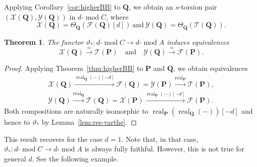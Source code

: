 \documentclass[11pt,a4paper,reqno]{amsart}
\theoremstyle{plain}
\newtheorem{theorem}{Theorem}[section]
\numberwithin{equation}{section}
\theoremstyle{definition}
\renewcommand{\mod}{\operatorname{mod}}
\newcommand{\real}{\operatorname{real}}
\newcommand{\emod}[2]{#1\text{-}\!\mod #2}
\newcommand{\PP}{\mathbf{P}}
\newcommand{\QQ}{\mathbf{Q}}
\newcommand{\T}{\mathcal{T}}
\newcommand{\F}{\mathcal{F}}
\newcommand{\X}{\mathcal{X}}
\newcommand{\Y}{\mathcal{Y}}
\begin{document}
Applying Corollary~\ref{cor:higherBB} to $\QQ$, we obtain an $s$-torsion pair $(\X(\QQ),\Y(\QQ))$ in $\emod{d}{C}$, where
\[\X(\QQ)=\Theta_{\QQ}(\F(\QQ)[d])\ \text{and}\ \Y(\QQ)=\Theta_{\QQ}(\T(\QQ)).\]

\begin{theorem}\label{thm:torsion-res}
The functor $\vartheta_*\colon\emod{d}{C}\to\emod{d}{A}$ induces equivalences
\[
 \X(\QQ)
 \xrightarrow{\simeq}
 \T(\PP)
 \quad\text{and}\quad
 \Y(\QQ)
 \xrightarrow{\simeq}
 \F(\PP).
\]
\end{theorem}

\begin{proof}
Applying Theorem~\ref{thm:higherBB} to $\PP$ and $\QQ$, we obtain equivalences
\[
\begin{gathered}
 \X(\QQ)\xrightarrow{\real_{\QQ}(-)[-d]}\F(\QQ)=\Y(\PP)\xrightarrow{\real_{\PP}}\T(\PP),\\
 \Y(\QQ)\xrightarrow{\real_{\QQ}}\T(\QQ)=\X(\PP)\xrightarrow{\real_{\PP}(-)[-d]}\F(\PP).
\end{gathered}
\]
Both compositions are naturally isomorphic to
$\real_{\PP}\left(\real_{\QQ}(-)\right)[-d]$ and hence to $\vartheta_*$ by Lemma~\ref{lem:res-varthe}.
\end{proof}

This result recovers \cite[Theorem 4.4]{BZ} for the case $d=1$. Note that, in that case, $\vartheta_*\colon\emod{d}{C}\to \emod{d}{A}$ is always fully faithful. However, this is not true for general $d$. See the following example.
\end{document}
